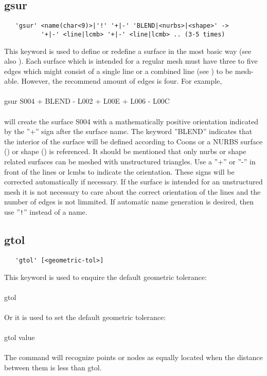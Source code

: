 \documentclass{article}
\begin{document}
\subsection{\label{gsur}gsur}
\begin{verbatim}
   'gsur' <name(char<9)>|'!' '+|-' 'BLEND|<nurbs>|<shape>' ->
          '+|-' <line|lcmb> '+|-' <line|lcmb> .. (3-5 times)
\end{verbatim}
This keyword is used to define or redefine a surface in the most basic way (see also ). Each surface which is intended for a regular mesh must have three to five edges which might consist of a single line or a combined line (see ) to be mesh-able. However, the recommend amount of edges is four. For example,\\\\gsur S004 + BLEND  - L002 + L00E + L006 - L00C\\\\will create the surface S004 with a mathematically positive orientation indicated by the ''+'' sign after the surface name. The keyword ''BLEND'' indicates that the interior of the surface will be defined according to Coons \cite{Coons} or a NURBS surface () or shape () is referenced. It should be mentioned that only nurbs or shape related surfaces can be meshed with unstructured triangles. Use a  ''+'' or ''-'' in front of the lines or lcmbs to indicate the orientation. These signs will be corrected automatically if necessary. If the surface is intended for an unstructured mesh it is not necessary to care about the correct orientation of the lines and the number of edges is not limmited. If automatic name generation is desired, then use ''\verb_!_'' instead of a name.

\subsection{\label{gtol}gtol}
\begin{verbatim}
   'gtol' [<geometric-tol>]
\end{verbatim}
This keyword is used to enquire the default geometric tolerance:\\\\
gtol\\\\
Or it is used to set the default geometric tolerance:\\\\
gtol value\\\\
The  command will recognize points or nodes as equally located when the distance between them is less than gtol.
\end{document}

